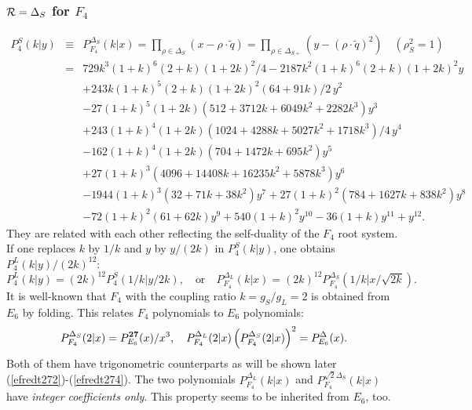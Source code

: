 \documentclass[a4paper,12pt]{article}
\begin{document}
\subsubsection{${\cal R}=\Delta_S$ for $F_4$}

\begin{eqnarray}
   P_4^S(k|y)&\!\!\equiv\!\!&P_{F_4}^{\Delta_S}(k|x)=
   \prod_{\rho\in{\Delta_{S}}}\left(x-\rho\cdot\tilde{q}\right)
   =\prod_{\rho\in{\Delta_{S+}}}\left(y-(\rho\cdot\tilde{q})^2\right)
   \quad (\rho_S^2=1)
   \nonumber\\
%
   &\!\!=\!\!&729k^3(1 + k)^6(2 + k)(1 + 2k)^2/4 -
   2187k^2(1 + k)^6(2 + k)(1 + 2k)^2y\nonumber\\
   && +
   243k(1 + k)^5(2 + k)(1 + 2k)^2(64 + 91k)/2\,y^2\nonumber\\
   && -
   27(1 + k)^5(1 + 2k)\left(512 + 3712k + 6049k^2 + 2282k^3\right)y^3
   \nonumber\\
   && + 243(1 + k)^4(1 + 2k)(1024 + 4288k + 5027k^2 +
   1718k^3)/4\,y^4\nonumber\\
   && - 162(1 + k)^4(1 + 2k)\left(704 + 1472k + 695k^2\right)y^5\nonumber\\
   && + 27(1 + k)^3\left(4096 + 14408k + 16235k^2 + 5878k^3\right)y^6
   \nonumber\\
   && - 1944(1 + k)^3\left(32 + 71k + 38k^2\right)y^7 +
   27(1 + k)^2\left(784 + 1627k + 838k^2\right)y^8\nonumber\\
   && - 72(1 + k)^2(61 + 62k)
   y^9 + 540(1 + k)^2y^{10} - 36(1 + k)y^{11} + y^{12}.
\end{eqnarray}
They are related with each other reflecting the self-duality of the $F_4$
root system. If one replaces $k$ by $1/k$ and $y$ by $y/(2k)$ in
$P_{4}^{S}(k|y)$, one obtains $P_{4}^{L}(k|y)/(2k)^{12}$:
\begin{equation}
   P_{4}^{L}(k|y)=(2k)^{12}P_{4}^{S}(1/k|y/2k),\quad
   \mbox{or}\quad
   P_{F_4}^{\Delta_L}(k|x)=(2k)^{12}P_{F_4}^{\Delta_S}(1/k|x/\sqrt{2k}).
\end{equation}
It is well-known that $F_4$ with the coupling ratio $k=g_S/g_L=2$ is
obtained from $E_6$ by folding. This relates $F_4$ polynomials to $E_6$
polynomials:
\begin{equation}
   P_{F_4}^{\Delta_S}(2|x)=P_{E_6}^{\bf 27}(x)/x^3,\quad
   P_{F_4}^{\Delta_L}(2|x)\left(P_{F_4}^{\Delta_S}(2|x)\right)^2=
   P_{E_6}^{\Delta}(x).
   \label{efredr272}
\end{equation}
Both of them have trigonometric counterparts as will be shown later
(\ref{efredt272})-(\ref{efredt274}).
The two polynomials $P_{F_4}^{\Delta_L}(k|x)$ and
$P_{F_4}^{\sqrt{2}\Delta_S}(k|x)$ have {\em integer coefficients only\/}.
This property seems to be  inherited from $E_6$, too.
\end{document}
